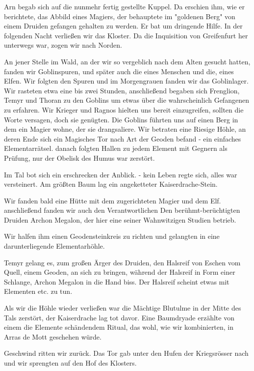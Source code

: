 \documentclass[11pt]{scrreprt}
\begin{document}
Arn begab sich auf die nunmehr fertig gestellte Kuppel. Da erschien ihm, wie er berichtete, das Abbild eines Magiers, der behauptete im "goldenen Berg" von einem Druiden gefangen gehalten zu werden. Er bat um dringende Hilfe.
In der folgenden Nacht verließen wir das Kloster. Da die Inquisition von Greifenfurt her unterwegs war, zogen wir nach Norden.\par
An jener Stelle im Wald, an der wir so vergeblich nach dem Alten gesucht hatten, fanden wir Goblinspuren, und später auch die eines Menschen und die, eines Elfen. Wir folgten den Spuren und im Morgengrauen fanden wir das Goblinlager. Wir rasteten etwa eine bis zwei Stunden, anschließend begaben sich Frenglion, Temyr und Thoran zu den Goblins um etwas über die wahrscheinlich Gefangenen zu erfahren. Wir Krieger und Ragnos hielten uns bereit einzugreifen, sollten die Worte versagen, doch sie genügten. Die Goblins führten uns auf einen Berg in dem ein Magier wohne, der sie drangsaliere. Wir betraten eine Riesige Höhle, an deren Ende sich ein Magisches Tor nach Art der Geoden befand - ein einfaches Elementarrätsel. danach folgten Hallen zu jedem Element mit Gegnern als Prüfung, nur der Obelisk des Humus war zerstört.\par
Im Tal bot sich ein erschrecken der Anblick. - kein Leben regte sich, alles war versteinert. Am größten Baum lag ein angeketteter Kaiserdrache-Stein.\par
Wir fanden bald eine Hütte mit dem zugerichteten Magier und dem Elf. anschließend fanden wir auch den Verantwortlichen Den berühmt-berüchtigten Druiden Archon Megalon, der hier eine seiner Wahnwitzigen Studien betrieb.\par
Wir halfen ihm einen Geodensteinkreis zu richten und gelangten in eine darunterliegende Elementarhöhle.\par
Temyr gelang es, zum großen Ärger des Druiden, den Halsreif von Eschen vom Quell, einem Geoden, an sich zu bringen, während der Halsreif in Form einer Schlange, Archon Megalon in die Hand biss. Der Halsreif scheint etwas mit Elementen etc. zu tun.\par
Als wir die Höhle wieder verließen war die Mächtige Blutulme in der Mitte des Tals zerstört, der Kaiserdrache lag tot davor. Eine Baumdryade erzählte von einem die Elemente schändendem Ritual, das wohl, wie wir kombinierten, in Arras de Mott geschehen würde.\par
Geschwind ritten wir zurück. Das Tor gab unter den Hufen der Kriegsrösser nach und wir sprengten auf den Hof des Klosters.\par
\end{document}
